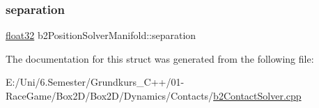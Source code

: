 \mbox{\label{structb2_position_solver_manifold_a9dd76b0c774238d3e3745d139cf6eea4}} 
\subsubsection{\texorpdfstring{separation}{separation}}
{\footnotesize\ttfamily \mbox{\hyperlink{b2_settings_8h_aacdc525d6f7bddb3ae95d5c311bd06a1}{float32}} b2\+Position\+Solver\+Manifold\+::separation}



The documentation for this struct was generated from the following file\+:\begin{DoxyCompactItemize}
\item 
E\+:/\+Uni/6.\+Semester/\+Grundkurs\+\_\+\+C++/01-\/\+Race\+Game/\+Box2\+D/\+Box2\+D/\+Dynamics/\+Contacts/\mbox{\hyperlink{b2_contact_solver_8cpp}{b2\+Contact\+Solver.\+cpp}}\end{DoxyCompactItemize}
